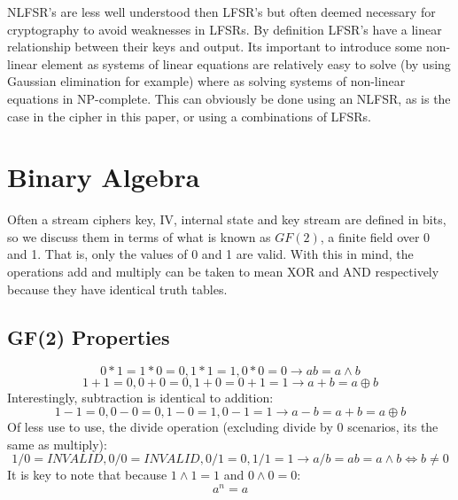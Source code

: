 \documentclass{report}
\let\Oldsection\section
\renewcommand{\section}{\FloatBarrier\Oldsection}
\let\Oldsubsection\subsection
\renewcommand{\subsection}{\FloatBarrier\Oldsubsection}
\begin{document}
\begin{figure}[!htb]
\end{figure}


NLFSR's are less well understood then LFSR's but often deemed necessary for cryptography to avoid weaknesses in LFSRs. By definition LFSR's have a linear relationship between their keys and output. Its important to introduce some non-linear element as systems of linear equations are relatively easy to solve (by using Gaussian elimination for example\cite{gaussian}) where as solving systems of non-linear equations in NP-complete\cite{NonlinearComp}.
This can obviously be done using an NLFSR, as is the case in the cipher in this paper, or using a combinations of LFSRs.

\section{Binary Algebra}
Often a stream ciphers key, IV, internal state and key stream are defined in bits, so we discuss them in terms of what is known as $\mathit{GF(2)}$, a finite field over 0 and 1. That is, only the values of 0 and 1 are valid. With this in mind, the operations add and multiply can be taken to mean XOR and AND respectively because they have identical truth tables.

\subsection{GF(2) Properties}
\begin{equation} \label{eq:GFtimes}
0*1 = 1*0=0, 1*1=1, 0*0=0 \to ab = a \land b
\end{equation}
\begin{equation} \label{eq:GFadd}
1+1=0, 0+0=0, 1+0=0+1=1 \to a+b = a \oplus b
\end{equation}
Interestingly, subtraction is identical to addition:
\begin{equation} \label{eq:GFminus}
1-1=0, 0-0=0, 1-0=1, 0-1=1 \to a-b = a+b = a \oplus b
\end{equation}
Of less use to use, the divide operation (excluding divide by 0 scenarios, its the same as multiply):
\begin{equation} \label{eq:GFdivide}
1/0=\mathit{INVALID}, 0/0=\mathit{INVALID}, 0/1=0, 1/1=1 \to a/b = ab = a \land b \iff b \neq 0
\end{equation}
It is key to note that because $1\land1=1$ and $0\land0 = 0$:
\begin{equation} \label{eq:GFpowers}
a^n = a
\end{equation}
\end{document}
